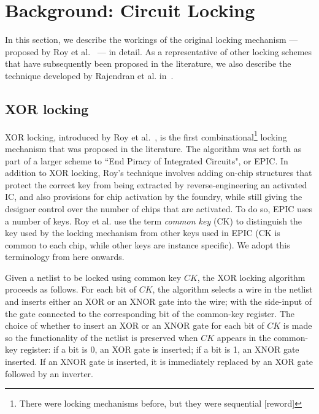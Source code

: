 \section{Background: Circuit Locking}

In this section, we describe the workings of the original locking mechanism --- proposed by Roy et al.~\cite{roy2008epic} --- in detail. As a representative of other locking schemes that have subsequently been proposed in the literature, we also describe the technique developed by Rajendran et al. in~\cite{rajendran2012logic}. %

\subsection{XOR locking~\cite{roy2008epic}}
XOR locking, introduced by Roy et al.~\cite{roy2008epic}, is the first combinational\footnote{There were locking mechanisms before, but they were sequential [reword]} locking mechanism that was proposed in the literature. The algorithm was set forth as part of a larger scheme to ``End Piracy of Integrated Circuits", or EPIC. In addition to XOR locking, Roy's technique involves adding on-chip structures that protect the correct key from being extracted by reverse-engineering an activated IC, and also provisions for chip activation by the foundry, while still giving the designer control over the number of chips that are activated. To do so, EPIC uses a number of keys. Roy et al. use the term \emph{common key} (CK) to distinguish the key used by the locking mechanism from other keys used in EPIC (CK is common to each chip, while other keys are instance specific). We adopt this terminology from here onwards.


Given a netlist to be locked using common key $CK$, the XOR locking algorithm proceeds as follows. For each bit of $CK$, the algorithm selects a wire in the netlist and inserts either an XOR or an XNOR gate into the wire; with the side-input of the gate connected to the corresponding bit of the common-key register. The choice of whether to insert an XOR or an XNOR gate for each bit of $CK$ is made so the functionality of the netlist is preserved when $CK$ appears in the common-key register: if a bit is 0, an XOR gate is inserted; if a bit is 1, an XNOR gate inserted. If an XNOR gate is inserted, it is immediately replaced by an XOR gate followed by an inverter. 

